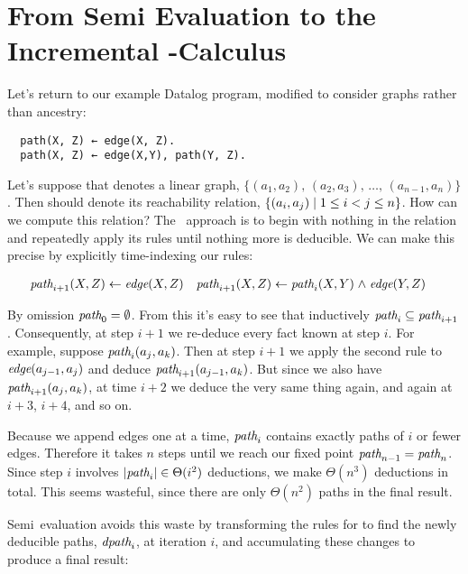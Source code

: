 \section{From Semi\naive{} Evaluation to the Incremental \boldfn-Calculus}
\label{sec:seminaive-and-ilc}

Let's return to our example Datalog program, modified to consider graphs rather
than ancestry:

\begin{verbatim}
  path(X, Z) ← edge(X, Z).
  path(X, Z) ← edge(X,Y), path(Y, Z).
\end{verbatim}

\noindent
Let's suppose that  denotes a linear graph, $\{(a_1, a_2),\, (a_2,
a_3),\, \dots,\, (a_{n-1}, a_n)\}$. Then  should denote its
reachability relation, $\{(a_i, a_j) \mathrel{|} 1 \le i < j \le n\}$. How can we
compute this relation? The \naive\ approach is to begin with nothing in the
 relation and repeatedly apply its rules until nothing more is
deducible. We can make this precise by explicitly time-indexing our rules:

\begin{align*}
  \name{path}_{i+1}(X,Z) &\gets \name{edge}(X,Z)
  &
  \name{path}_{i+1}(X,Z) &\gets \name{path}_i(X,Y) \wedge \name{edge}(Y,Z)
\end{align*}

By omission $\text{\itshape path}_0 = \emptyset$. From this it's easy to see that
inductively $\text{\itshape path}_i \subseteq \text{\itshape path}_{i+1}$.
%
Consequently, at step $i+1$ we re-deduce every fact known at step $i$.
%
For example, suppose $\text{\itshape path}_i(a_j, a_k)$. Then at step $i+1$ we apply the
second rule to $\text{\itshape edge}(a_{j-1}, a_j)$ and deduce
$\text{\itshape path}_{i+1}(a_{j-1}, a_k)$.
%
But since we also have $\text{\itshape path}_{i+1}(a_j, a_k)$, at time $i+2$ we deduce
the very same thing again, and again at $i+3$, $i+4$, and so on.

Because we append edges one at a time, $\text{\itshape path}_i$ contains exactly paths of
$i$ or fewer edges. Therefore it takes $n$ steps until we reach our fixed point
$\text{\itshape path}_{n-1} = \text{\itshape path}_n$. Since step $i$ involves $|\text{\itshape path}_i|
\in \Theta(i^2)$ deductions, we make $\Theta(n^3)$ deductions in total. This
seems wasteful, since there are only $\Theta(n^2)$ paths in the final result.

Semi\naive\ evaluation avoids this waste by transforming the rules for
 to find the newly deducible paths, $\text{\itshape dpath}_i$, at iteration
$i$, and accumulating these changes to produce a final result:


